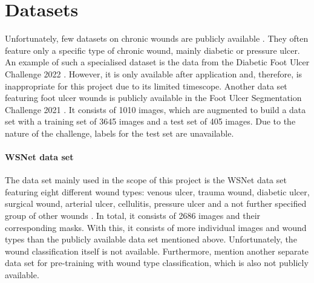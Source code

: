 \section{Datasets}\label{sec:data-sets}

Unfortunately, few datasets on chronic wounds are publicly available \cite{Oota_2023_WACV}. They often feature only a specific type of chronic wound, mainly diabetic or pressure ulcer. An example of such a specialised dataset is the data from the Diabetic Foot Ulcer Challenge 2022 \cite{DFUC2022}. However, it is only available after application and, therefore, is inappropriate for this project due to its limited timescope. Another data set featuring foot ulcer wounds is publicly available in the Foot Ulcer Segmentation Challenge 2021 \cite{Wang2020}. It consists of 1010 images, which are augmented to build a data set with a training set of 3645 images and a test set of 405 images. Due to the nature of the challenge, labels for the test set are unavailable.

\paragraph{WSNet data set} The data set mainly used in the scope of this project is the WSNet data set featuring eight different wound types: venous ulcer, trauma wound, diabetic ulcer, surgical wound, arterial ulcer, cellulitis, pressure ulcer and a not further specified group of other wounds \cite{Oota_2023_WACV, Oota_2021_WACV}. In total, it consists of 2686 images and their corresponding masks. With this, it consists of more individual images and wound types than the publicly available data set mentioned above. Unfortunately, the wound classification itself is not available. Furthermore, \citeauthor{Oota_2023_WACV} mention another separate data set for pre-training with wound type classification, which is also not publicly available.
